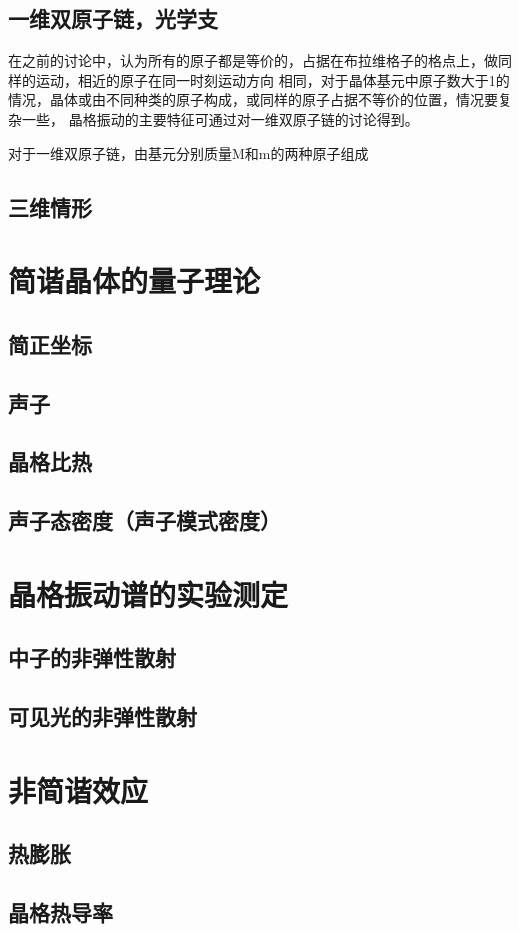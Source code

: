         \subsection{一维双原子链，光学支}
            在之前的讨论中，认为所有的原子都是等价的，占据在布拉维格子的格点上，做同样的运动，相近的原子在同一时刻运动方向
            相同，对于晶体基元中原子数大于1的情况，晶体或由不同种类的原子构成，或同样的原子占据不等价的位置，情况要复杂一些，
            晶格振动的主要特征可通过对一维双原子链的讨论得到。

            对于一维双原子链，由基元分别质量M和m的两种原子组成
        \subsection{三维情形}
    \section{简谐晶体的量子理论}
        \subsection{简正坐标}
        \subsection{声子}
        \subsection{晶格比热}
        \subsection{声子态密度（声子模式密度）}
    \section{晶格振动谱的实验测定}
        \subsection{中子的非弹性散射}
        \subsection{可见光的非弹性散射}
    \section{非简谐效应}
        \subsection{热膨胀}
        \subsection{晶格热导率}